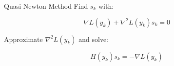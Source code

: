 \begin{frame}{Quasi Newton-Method}
Find $s_k$ with:
\begin{block}{}
\[ \nabla L(y_{k}) + \nabla^2 L(y_k) s_{k} = 0 \]
\end{block} 
\vspace{1em}
Approximate $\nabla^2 L(y_k)$ and solve:
\begin{block}{}
\[ H(y_k) s_{k} = -\nabla L(y_{k}) \]
\end{block} 
\end{frame}

